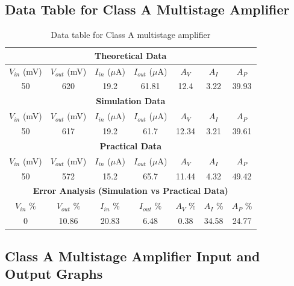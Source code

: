 \documentclass[12pt]{article}
\begin{document}
\subsection{Data Table for Class A Multistage Amplifier}
\bgroup
\def\arraystretch{1.5}
\begin{table}[h!]
    \centering
    \caption{Data table for Class A multistage amplifier}
    \begin{tabular}{|c|c|c|c|c|c|c|}
        \hline
        \multicolumn{7}{|c|}{\textbf{Theoretical Data}} \\
        \hline
        $V_{in}$ (mV) & $V_{out}$ (mV) & $I_{in}$ ($\mu$A) & $I_{out}$ ($\mu$A) & $A_V$ & $A_I$ & $A_P$ \\ \hline
        50 & 620 & 19.2 & 61.81 & 12.4 & 3.22 & 39.93 \\ \hline\hline
        \multicolumn{7}{|c|}{\textbf{Simulation Data}} \\
        \hline
        $V_{in}$ (mV) & $V_{out}$ (mV) & $I_{in}$ ($\mu$A) & $I_{out}$ ($\mu$A) & $A_V$ & $A_I$ & $A_P$ \\ \hline
        50 & 617 & 19.2 & 61.7 & 12.34 & 3.21 & 39.61 \\ \hline\hline
        \multicolumn{7}{|c|}{\textbf{Practical Data}} \\
        \hline
        $V_{in}$ (mV) & $V_{out}$ (mV) & $I_{in}$ ($\mu$A) & $I_{out}$ ($\mu$A) & $A_V$ & $A_I$ & $A_P$ \\ \hline
        50 & 572 & 15.2 & 65.7 & 11.44 & 4.32 & 49.42 \\ \hline\hline
        \multicolumn{7}{|c|}{\textbf{Error Analysis (Simulation vs Practical Data)}} \\
        \hline
        $V_{in}$ \% & $V_{out}$ \% & $I_{in}$ \% & $I_{out}$ \% & $A_V$ \% & $A_I$ \% & $A_P$ \% \\ \hline
        0 & 10.86 & 20.83 & 6.48 & 0.38 & 34.58 & 24.77 \\ \hline
    \end{tabular}
\end{table}
\egroup

\subsection{Class A Multistage Amplifier Input and Output Graphs}
\end{document}
